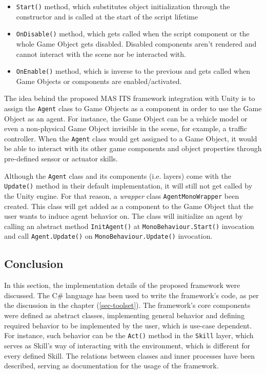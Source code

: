 \documentclass[main.tex]{subfiles}
\begin{document}
\begin{itemize}
    \item \texttt{Start()} method, which substitutes object initialization 
through the constructor and is called at the start of the script lifetime
    \item \texttt{OnDisable()} method, which gets called when the script component or the whole Game Object 
    gets disabled. Disabled components aren't rendered and cannot interact with the scene nor be interacted 
    with. 
    \item \texttt{OnEnable()} method, which is inverse to the previous and gets called when Game Objects 
    or components are enabled/activated.
\end{itemize}

The idea behind the proposed MAS ITS framework integration with Unity is to assign the \texttt{Agent} 
class to Game Objects as a component in order to use the Game Object as an agent. For instance, the Game Object can be 
a vehicle model or even a non-physical Game Object invisible in the scene, for example, a traffic controller. When 
the \texttt{Agent} class would get assigned to a Game Object, it would be able to interact with its other game
components and object properties through pre-defined sensor or actuator skills. 

Although the \texttt{Agent} class and its components (i.e. layers) come with the \texttt{Update()} method in 
their default implementation, it will still not get called by the Unity engine. For that reason, a \emph{wrapper}
class \texttt{AgentMonoWrapper} been created. This class will get added as a component to the Game Object that 
the user wants to induce agent behavior on. The class will initialize an agent by calling an abstract method 
\texttt{InitAgent()} at \texttt{MonoBehaviour.Start()} invocation and call \texttt{Agent.Update()} on 
\texttt{MonoBehaviour.Update()} invocation. 

\subsection{Conclusion}

In this section, the implementation details of the proposed framework were discussed. The C\# language has been 
used to write the framework's code, as per the discussion in the chapter (\ref{sec-toolset}). The framework's core 
components were defined as abstract classes, implementing general behavior and defining required behavior to 
be implemented by the user, which is use-case dependent. For instance, such behavior can be the \texttt{Act()}
method in the \texttt{Skill} layer, which serves as Skill's way of interacting with the environment, which is 
different for every defined Skill. The relations between classes and inner processes have been described, serving 
as documentation for the usage of the framework. 
\end{document}

